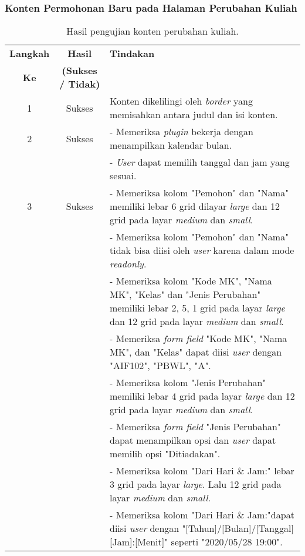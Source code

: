 \subsubsection{Konten Permohonan Baru pada Halaman Perubahan Kuliah}
\begin{table}	
	\centering
	\caption{Hasil pengujian konten perubahan kuliah.}
	\label{hasil:PermohonanPerubahanKuliah}
		\begin{tabular}{|c| c| p{}|}				
			\toprule
			\textbf{Langkah} & \textbf{Hasil} & \textbf{Tindakan}\\
			\textbf{Ke} & \textbf{(Sukses / Tidak)} &\\
			\midrule
			1&Sukses&Konten dikelilingi oleh \textit{border} yang memisahkan antara judul dan isi konten.\\
			\hline
			2&Sukses&- Memeriksa \textit{plugin} bekerja dengan menampilkan kalendar bulan.\\
			&&- \textit{User} dapat memilih tanggal dan jam yang sesuai.\\
			\hline
			3&Sukses& - Memeriksa kolom "Pemohon" dan "Nama" memiliki lebar 6 grid dilayar \textit{large} dan 12 grid pada layar \textit{medium} dan \textit{small}.\\
			&& - Memeriksa kolom "Pemohon" dan "Nama" tidak bisa diisi oleh \textit{user} karena dalam mode \textit{readonly}.\\
			
			&& - Memeriksa kolom "Kode MK", "Nama MK", "Kelas" dan "Jenis Perubahan" memiliki lebar 2, 5, 1 grid pada layar \textit{large} dan 12 grid pada layar \textit{medium} dan \textit{small}.\\
			&& - Memeriksa \textit{form field} "Kode MK", "Nama MK", dan "Kelas" dapat diisi \textit{user} dengan "AIF102", "PBWL", "A".\\
			
			&& - Memeriksa kolom "Jenis Perubahan" memiliki lebar 4 grid pada layar \textit{large} dan 12 grid pada layar \textit{medium} dan \textit{small}.\\
			&& - Memeriksa \textit{form field} "Jenis Perubahan" dapat menampilkan opsi dan \textit{user} dapat memilih opsi "Ditiadakan".\\
			
			&& - Memeriksa kolom "Dari Hari \& Jam:" lebar 3 grid pada layar \textit{large}. Lalu 12 grid pada layar \textit{medium} dan \textit{small}.\\
			&& - Memeriksa kolom "Dari Hari \& Jam:"dapat diisi \textit{user} dengan "[Tahun]/[Bulan]/[Tanggal] [Jam]:[Menit]" seperti "2020/05/28 19:00".\\
			

\end{tabular}
\end{table}
